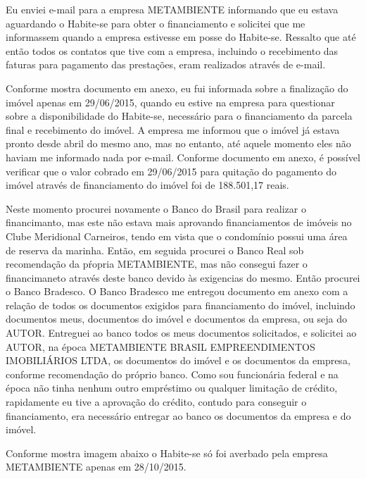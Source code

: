 \documentclass[11pt]{letter}
\begin{document}
Eu enviei e-mail para a empresa METAMBIENTE informando que eu estava aguardando o Habite-se para obter o financiamento e solicitei que me informassem quando a empresa estivesse em posse do Habite-se. Ressalto que até então todos os contatos que tive com a empresa, incluindo o recebimento das faturas para pagamento das prestações, eram realizados através de e-mail.

Conforme mostra documento em anexo, eu fui informada sobre a finalização do imóvel apenas em 29/06/2015, quando eu estive na empresa para questionar sobre a disponibilidade do Habite-se, necessário para o financiamento da parcela final e recebimento do imóvel. A empresa me informou que o imóvel já estava pronto desde abril do mesmo ano, mas no entanto, até aquele momento eles não haviam me informado nada por e-mail. Conforme documento em anexo, é possível verificar que o valor cobrado em 29/06/2015 para quitação do pagamento do imóvel através de financiamento do imóvel foi de 188.501,17 reais.

Neste momento procurei novamente o Banco do Brasil para realizar o financimanto, mas este não estava mais aprovando financiamentos de imóveis no Clube Meridional Carneiros, tendo em vista que o condomínio possui uma área de reserva da marinha. Então, em seguida procurei o Banco Real sob recomendação da pŕopria METAMBIENTE, mas não consegui fazer o financimaneto através deste banco devido às exigencias do mesmo. Então procurei o Banco Bradesco. O Banco Bradesco me entregou documento em anexo com a relação de todos os documentos exigidos para financiamento do imóvel, incluindo documentos meus, documentos do imóvel e documentos da empresa, ou seja do AUTOR. Entreguei ao banco todos os meus documentos solicitados, e solicitei ao AUTOR, na época METAMBIENTE BRASIL EMPREENDIMENTOS IMOBILIÁRIOS LTDA, os documentos do imóvel e os documentos da empresa, conforme recomendação do próprio banco. Como sou funcionária federal e na época não tinha nenhum outro empréstimo ou qualquer limitação de crédito, rapidamente eu tive a aprovação do crédito, contudo para conseguir o financiamento, era necessário entregar ao banco os documentos da empresa e do imóvel.

Conforme mostra imagem abaixo o Habite-se só foi averbado pela empresa METAMBIENTE apenas em 28/10/2015.
\end{document}
